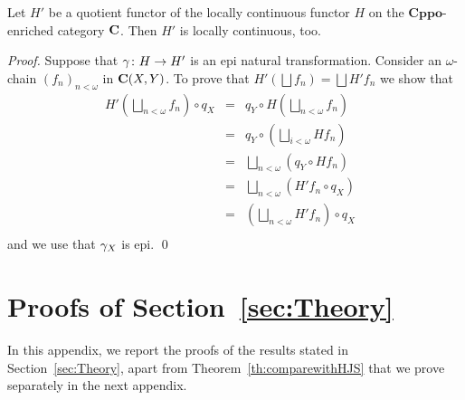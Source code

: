 \documentclass[oribibl,envcountsame,envcountsect,runningheads]{llncs}
\newcommand{\cat}[1]{\ensuremath{\mathbf{#1}}}
\newcommand{\cppo}{\cat{Cppo}}
\renewcommand{\>}{\rangle}
\begin{document}
\begin{proposition}
  \label{lem:quot}
 Let $H'$ be a quotient functor of the locally continuous functor $H$ on the \cppo-enriched category $\C$. Then $H'$ is locally continuous, too.
\end{proposition}
\begin{proof}
 Suppose that $\gamma \colon H \to H'$ is an epi natural transformation.
 Consider an $\omega$-chain $(f_n)_{n<\omega}$ in $\C(X,Y)$. To prove that $H'(\bigsqcup f_n) = \bigsqcup H'f_n$ we show that
\begin{align*}
H' (\bigsqcup_{n< \omega} f_n) \circ q_X &= & q_Y \circ H(\bigsqcup_{n< \omega} f_n) \tag{naturality of $\quotG$}\\
  & = &q_Y \circ (\bigsqcup_{i< \omega} Hf_n) & \tag{$H$ locally continuous} \\
& = & \bigsqcup_{n< \omega} (q_Y \circ  Hf_n ) & \tag{continuity of comp.} \\
& = & \bigsqcup_{n< \omega} (H'f_n \circ q_X ) & \tag{naturality of $\quotG$} \\
& = &  (\bigsqcup_{n< \omega} H'f_n) \circ q_X  & \tag{continuity of comp.} \\
\end{align*}
and we use that $\gamma_X$ is epi.
\qed
\end{proof}










\section{Proofs of Section~\ref{sec:Theory}}\label{App:proofsTheory}

In this appendix, we report the proofs of the results stated in Section~\ref{sec:Theory}, apart from Theorem~\ref{th:comparewithHJS} that we prove separately in the next appendix.
\end{document}
